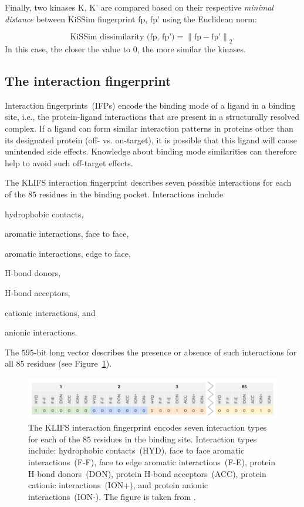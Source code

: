 \documentclass[9pt,training]{livecoms}
\newcommand{\kinA}{K}
\newcommand{\kinB}{K'}
\begin{document}
Finally, two kinases \kinA{}, \kinB{} are compared based on their respective \textit{minimal distance} between KiSSim fingerprint fp, fp' using the Euclidean norm:

\begin{equation}
    \text{KiSSim dissimilarity (fp, fp')} = \left\lVert\text{fp} - \text{fp'}\right\rVert_2.
\end{equation}
In this case, the closer the value to $0$, the more similar the kinases.

\subsection{The interaction fingerprint}
Interaction fingerprints~(IFPs) encode the binding mode of a ligand in a binding site, i.e., the protein-ligand interactions that are present in a structurally resolved complex. If a ligand can form similar interaction patterns in proteins other than its designated protein (off- vs. on-target), it is possible that this ligand will cause unintended side effects. Knowledge about binding mode similarities can therefore help to avoid such off-target effects.

The KLIFS interaction fingerprint describes seven possible interactions for each of the $85$ residues in the binding pocket. Interactions include
\begin{enumerate*}
    \item hydrophobic contacts,
    \item aromatic interactions, face to face,
    \item aromatic interactions, edge to face,
    \item H-bond donors,
    \item H-bond acceptors,
    \item cationic interactions, and
    \item anionic interactions. 
\end{enumerate*}
The $595$-bit long vector describes the presence or absence of such interactions for all $85$ residues (see Figure~\ref{fig:ifp_similarity}).

\begin{figure}[ht]
    \centering
    \includegraphics[width=\columnwidth]{IFP.png}
    \caption{The KLIFS interaction fingerprint encodes seven interaction types for each of the $85$ residues in the binding site. Interaction types include: hydrophobic contacts~(HYD), face to face aromatic interactions~(F-F), face to edge aromatic interactions~(F-E), protein H-bond donors~(DON), protein H-bond acceptors~(ACC), protein cationic interactions~(ION+), and protein anionic interactions~(ION-). The figure is taken from \cite{toc_website}.}
    \label{fig:ifp_similarity}
\end{figure}
\end{document}
